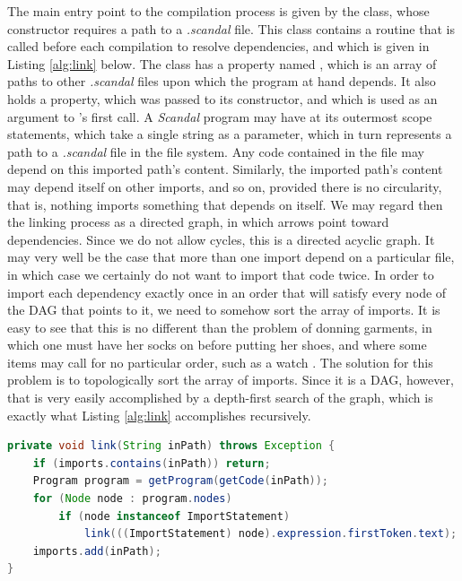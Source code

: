 The main entry point to the compilation process is given by the  class, whose constructor requires a path to a \emph{.scandal} file. This class contains a  routine that is called before each compilation to resolve dependencies, and which is given in Listing \ref{alg:link} below. The  class has a property named , which is an array of paths to other \emph{.scandal} files upon which the program at hand depends. It also holds a  property, which was passed to its constructor, and which is used as an argument to 's first call. A \emph{Scandal} program may have at its outermost scope  statements, which take a single string as a parameter, which in turn represents a path to a \emph{.scandal} file in the file system. Any code contained in the file may depend on this imported path's content. Similarly, the imported path's content may depend itself on other imports, and so on, provided there is no circularity, that is, nothing imports something that depends on itself. We may regard then the linking process as a directed graph, in which arrows point toward dependencies. Since we do not allow cycles, this is a directed acyclic graph. It may very well be the case that more than one import depend on a particular file, in which case we certainly do not want to import that code twice. In order to import each dependency exactly once in an order that will satisfy every node of the DAG that points to it, we need to somehow sort the array of imports. It is easy to see that this is no different than the problem of donning garments, in which one must have her socks on before putting her shoes, and where some items may call for no particular order, such as a watch \cite[612]{Cormen2009}. The solution for this problem is to topologically sort the array of imports. Since it is a DAG, however, that is very easily accomplished by a depth-first search of the graph, which is exactly what Listing \ref{alg:link} accomplishes recursively.

\begin{lstlisting}[language=Java,caption={The linking process of a \emph{Scandal} program.},label={alg:link}]
private void link(String inPath) throws Exception {
	if (imports.contains(inPath)) return;
	Program program = getProgram(getCode(inPath));
	for (Node node : program.nodes)
		if (node instanceof ImportStatement)
			link(((ImportStatement) node).expression.firstToken.text);
	imports.add(inPath);
}
\end{lstlisting}

